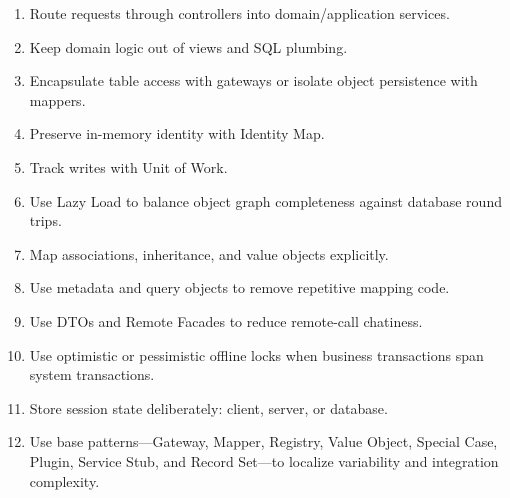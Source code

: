 \documentclass[11pt]{article}
\providecommand{\tightlist}{\setlength{\itemsep}{0pt}\setlength{\parskip}{0pt}}
\begin{document}
\begin{enumerate}
\def\labelenumi{\arabic{enumi}.}
\tightlist
\item
  Route requests through controllers into domain/application services.
\item
  Keep domain logic out of views and SQL plumbing.
\item
  Encapsulate table access with gateways or isolate object persistence
  with mappers.
\item
  Preserve in-memory identity with Identity Map.
\item
  Track writes with Unit of Work.
\item
  Use Lazy Load to balance object graph completeness against database
  round trips.
\item
  Map associations, inheritance, and value objects explicitly.
\item
  Use metadata and query objects to remove repetitive mapping code.
\item
  Use DTOs and Remote Facades to reduce remote-call chatiness.
\item
  Use optimistic or pessimistic offline locks when business transactions
  span system transactions.
\item
  Store session state deliberately: client, server, or database.
\item
  Use base patterns---Gateway, Mapper, Registry, Value Object, Special
  Case, Plugin, Service Stub, and Record Set---to localize variability
  and integration complexity.
\end{enumerate}
\end{document}

